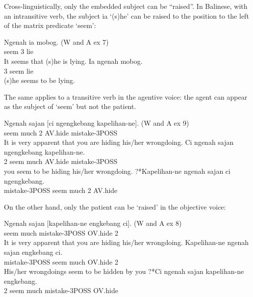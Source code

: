 \documentclass[output=paper]{langsci/langscibook}
\begin{document}
Cross-linguistically, only the embedded subject can be ``raised''. In Balinese, with an intransitive verb, the subject ia ‘(s)he’ can be raised to the position to the left of the matrix predicate  ‘seem’:

\begin{exe}
\ex \begin{xlist}
\ex \gll Ngenah ia mobog. (W and A ex 7)\\
seem 3 lie\\
\glt It seems that (s)he is lying.
\ex \gll  Ia ngenah mobog.\\
3 seem lie\\
\glt (s)he seems to be lying.
\end{xlist}
\end{exe}

The same applies to a transitive verb in the agentive voice: the agent can appear as the subject of `seem' but not the patient.

\begin{exe}
\ex \begin{xlist}
\ex \gll Ngenah sajan [ci ngengkebang kapelihan-ne]. (W and A ex 9)\\
seem much 2 AV.hide mistake-3POSS\\
\glt It is very apparent that you are hiding his/her wrongdoing.
\ex \gll Ci ngenah sajan ngengkebang kapelihan-ne.\\
2 seem much AV.hide mistake-3POSS\\
\glt you seem to be hiding his/her wrongdoing.
\ex ?*Kapelihan-ne ngenah sajan ci ngengkebang.\\
mistake-3POSS seem much 2 AV.hide
\end{xlist}

\end{exe}

On the other hand, only the patient can be `raised' in the objective voice:

\begin{exe}
\ex \begin{xlist}
\ex \gll Ngenah sajan [kapelihan-ne engkebang ci]. (W and A ex 8)\\
seem much mistake-3POSS OV.hide 2\\
\glt It is very apparent that you are hiding his/her wrongdoing.
\ex \gll Kapelihan-ne ngenah sajan engkebang ci.\\
mistake-3POSS seem much OV.hide 2 \\
\glt His/her wrongdoings seem to be hidden by you 
\ex \gll ?*Ci ngenah sajan kapelihan-ne engkebang.\\
2 seem much mistake-3POSS OV.hide \\
\end{xlist}

\end{exe}
\end{document}
